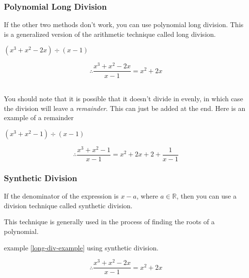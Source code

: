 \documentclass[english,course]{lecture}
\begin{document}
\subsubsection{Polynomial Long Division}


If the other two methods don't work, you can use polynomial long division.
This is a generalized version of the arithmetic technique called long division.

\begin{example}[Simplify]\label{long-div-example}
	$(x^3 + x^2 - 2x) \div (x - 1)$


	\begin{center}
	\end{center}

	$$
		\therefore \frac{x^3 + x^2 - 2x}{x - 1} = x^2 + 2x
	$$
\end{example}
\\
You should note that it is possible that it doesn't divide in evenly,
in which case the division will leave a \emph{remainder}.
This can just be added at the end. Here is an example of a remainder

\begin{example}[Simplify]
	$(x^3 + x^2 - 1) \div (x - 1)$


	\begin{center}
	\end{center}

	$$
		\therefore \frac{x^3 + x^2 - 1}{x - 1} = x^2 + 2x + 2 + \frac{1}{x - 1}
	$$

\end{example}

\subsubsection{Synthetic Division}

If the denominator of the expression is $x - a$, where $a \in \mathbb{R}$, then you can use a
division technique called synthetic division.

This technique is generally used in the process of finding the roots of a polynomial.

\begin{example}[Complete]
	example \ref{long-div-example} using synthetic division.

	\begin{center}
	\end{center}

	$$
		\therefore \frac{x^3 + x^2 - 2x}{x - 1} = x^2 + 2x
	$$

\end{example}
\end{document}
